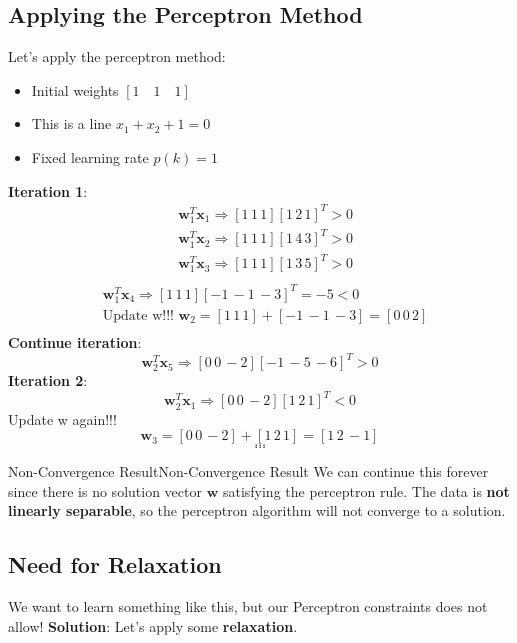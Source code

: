 \documentclass[a4paper]{article}
\theoremstyle{definition}
\begin{document}
\subsection{Applying the Perceptron Method}
Let's apply the perceptron method:
\begin{itemize}
    \item Initial weights \( [1 \quad 1 \quad 1] \)    
    \item This is a line \( x_1 + x_2 + 1 = 0 \)      
    \item Fixed learning rate \( p(k) = 1 \)
\end{itemize}
\textbf{Iteration 1}:
\begin{align*}
    & \mathbf{w}_{1}^{T} \mathbf{x}_1 \Rightarrow [1\,1\,1][1\,2\,1]^T > 0 \\
    & \mathbf{w}_{1}^{T} \mathbf{x}_2 \Rightarrow [1\,1\,1][1\,4\,3]^T > 0 \\
    & \mathbf{w}_{1}^{T} \mathbf{x}_3 \Rightarrow [1\,1\,1][1\,3\,5]^T > 0 \\
\end{align*}
\begin{align*}
    & \mathbf{w}_{1}^{T} \mathbf{x}_4 \Rightarrow [1\,1\,1][-1\,-1\,-3]^T = -5 < 0 \\
    & \text{Update w!!! } \mathbf{w}_2 = [1\,1\,1] + [-1\,-1\,-3] = [0\,0\,2] \\
\end{align*}
\textbf{Continue iteration}:
\[
    \mathbf{w}_{2}^{T} \mathbf{x}_5 \Rightarrow [0\,0\,-2][-1\,-5\,-6]^T > 0
\]
\textbf{Iteration 2}:
\[
  \mathbf{w}_{2}^{T} \mathbf{x}_1 \Rightarrow [0\,0\,-2][1\,2\,1]^T < 0
\]
Update w again!!!
\[
  \mathbf{w}_3 = [0\,0\,-2] + [1\,2\,1] = [1\,2\,-1]
\]
\[
  \ldots
\]
\[
  \ldots
\]
\begin{definition}{Non-Convergence Result}{Non-Convergence Result}
We can continue this forever since there is no solution vector \( \mathbf{w} \) satisfying the perceptron rule.
\newline 
The data is \textbf{not linearly separable}, so the perceptron algorithm will not converge to a solution.
\end{definition}
\subsection{Need for Relaxation}
We want to learn something like this, but our Perceptron constraints does not allow!
\vspace{1em}
\noindent
\newline 
\textbf{Solution}: Let's apply some \textbf{relaxation}.
\end{document}
